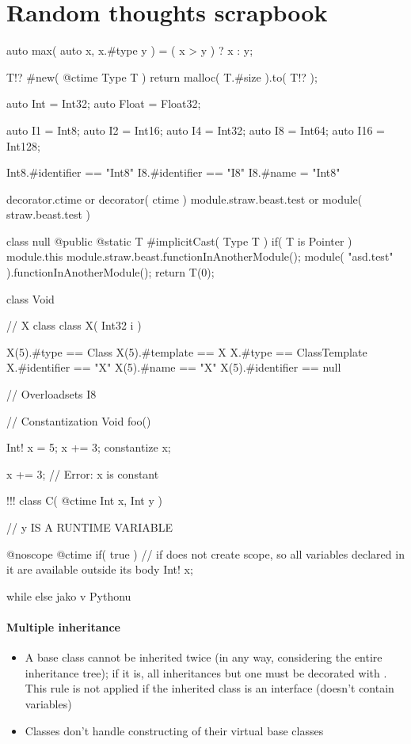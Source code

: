 \section{Random thoughts scrapbook}
\begin{code}
auto max( auto x, x.#type y ) = ( x > y ) ? x : y;

T!? #new( @ctime Type T ) {
	return malloc( T.#size ).to( T!? );
}

auto Int = Int32;
auto Float = Float32;

auto I1 = Int8;
auto I2 = Int16;
auto I4 = Int32;
auto I8 = Int64;
auto I16 = Int128;

Int8.#identifier == "Int8"
I8.#identifier == "I8"
I8.#name = "Int8"

decorator.ctime or decorator( ctime )
module.straw.beast.test or module( straw.beast.test )

class null {
	@public @static	T #implicitCast( Type T )
		if( T is Pointer )
	{
		module.this
		module.straw.beast.functionInAnotherModule();
		module( "asd.test" ).functionInAnotherModule();
		return T(0);
	}
}

class Void {}


// X class
class X( Int32 i ) {
}

X(5).#type == Class
X(5).#template == X
X.#type == ClassTemplate
X.#identifier == "X"
X(5).#name == "X"
X(5).#identifier == null

// Overloadsets
I8

// Constantization
Void foo() {
	Int! x = 5;
	x += 3;
	constantize x;
	
	x += 3; // Error: x is constant
}

!!!
class C( @ctime Int x, Int y ) { // y IS A RUNTIME VARIABLE

}


@noscope @ctime if( true ) // if does not create scope, so all variables declared in it are available outside its body
	Int! x;
	
	while else jako v Pythonu
	
\end{code}

\paragraph{Multiple inheritance}
\begin{itemize}
	\item A base class cannot be inherited twice (in any way, considering the entire inheritance tree); if it is, all inheritances but one must be decorated with . This rule is not applied if the inherited class is an interface (doesn't contain variables)
	\item Classes don't handle constructing of their virtual base classes
\end{itemize}

